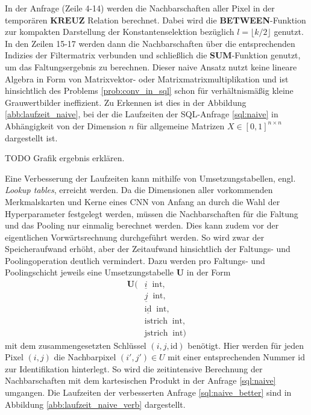 In der Anfrage (Zeile 4-14) werden die Nachbarschaften aller Pixel in der temporären $\mathbf{KREUZ}$ Relation berechnet. Dabei wird die \textbf{BETWEEN}-Funktion zur kompakten Darstellung der Konstantenselektion bezüglich $l=\lfloor k/2 \rfloor$ genutzt. In den Zeilen 15-17 werden dann die Nachbarschaften über die entsprechenden Indizies der Filtermatrix verbunden und schließlich die \textbf{SUM}-Funktion genutzt, um das Faltungsergebnis zu berechnen. Dieser naive Ansatz nutzt keine lineare Algebra in Form von Matrixvektor- oder Matrixmatrixmultiplikation und ist hinsichtlich des Problems \ref{prob:conv_in_sql} schon für verhältnismäßig kleine Grauwertbilder ineffizient. Zu Erkennen ist dies in der Abbildung \ref{abb:laufzeit_naive}, bei der die Laufzeiten der SQL-Anfrage \ref{sql:naive} in Abhängigkeit von der Dimension $n$ für allgemeine Matrizen $X \in [0,1]^{n \times n}$ dargestellt ist.

TODO Grafik ergebnis erklären.

Eine Verbesserung der Laufzeiten kann mithilfe von Umsetzungstabellen, engl. \textit{Lookup tables}, erreicht werden. Da die Dimensionen aller vorkommenden Merkmalskarten und Kerne eines CNN von Anfang an durch die Wahl der Hyperparameter festgelegt werden, müssen die Nachbarschaften für die Faltung und das Pooling nur einmalig berechnet werden. Dies kann zudem vor der eigentlichen Vorwärtsrechnung durchgeführt werden. So wird zwar der Speicheraufwand erhöht, aber der Zeitaufwand hinsichtlich der Faltungs- und Poolingoperation deutlich vermindert. Dazu werden pro Faltungs- und Poolingschicht jeweils eine Umsetzungstabelle \textbf{U} in der Form 
\begin{align*}
    \mathbf{U}( &\underline{i} \; \; \mathrm{int}, \\
    &\underline{j} \; \;\mathrm{int},\\
    &\underline{\text{id}} \; \; \mathrm{int}, \\
    &\text{istrich} \; \; \mathrm{int},\\
    &\text{jstrich}\; \; \mathrm{int})
\end{align*}
mit dem zusammengesetzten Schlüssel $(i,j,\text{id})$ benötigt. Hier werden für jeden Pixel $(i,j)$ die Nachbarpixel $(i', j') \in U$ mit einer entsprechenden Nummer $\text{id}$ zur Identifikation  hinterlegt. So wird die zeitintensive Berechnung der Nachbarschaften mit dem  kartesischen Produkt in der Anfrage \ref{sql:naive} umgangen. Die Laufzeiten der verbesserten Anfrage \ref{sql:naive_better} sind in Abbildung \ref{abb:laufzeit_naive_verb} dargestellt.

